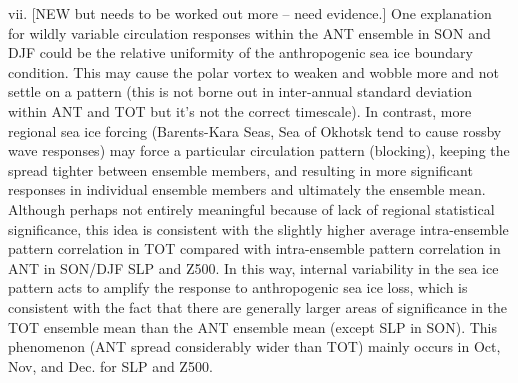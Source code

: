 \documentclass[twocol]{ametsoc}
\begin{document}
vii. [NEW but needs to be worked out more -- need evidence.] One explanation for wildly variable circulation responses within the ANT ensemble in SON and DJF could be the relative uniformity of the anthropogenic sea ice boundary condition. This may cause the polar vortex to weaken and wobble more and not settle on a pattern (this is not borne out in inter-annual standard deviation within ANT and TOT but it's not the correct timescale). In contrast, more regional sea ice forcing (Barents-Kara Seas, Sea of Okhotsk tend to cause rossby wave responses) may force a particular circulation pattern (blocking), keeping the spread tighter between ensemble members, and resulting in more significant responses in individual ensemble members and ultimately the ensemble mean. Although perhaps not entirely meaningful because of lack of regional statistical significance, this idea is consistent with the slightly higher average intra-ensemble pattern correlation in TOT compared with intra-ensemble pattern correlation in ANT in SON/DJF SLP and Z500. In this way, internal variability in the sea ice pattern acts to amplify the response to anthropogenic sea ice loss, which is consistent with the fact that there are generally larger areas of significance in the TOT ensemble mean than the ANT ensemble mean (except SLP in SON). This phenomenon (ANT spread considerably wider than TOT) mainly occurs in Oct, Nov, and Dec. for SLP and Z500. \\
\end{document}
